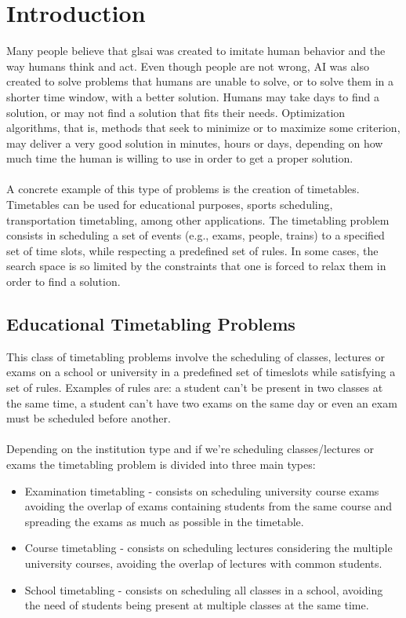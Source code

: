 \setcounter{secnumdepth}{2}
\chapter{Introduction}
\label{introduction}
\thispagestyle{plain}

Many people believe that gls{ai} was created to imitate human behavior and the way humans think and act. Even though people are not wrong, AI was also created to solve problems that humans are unable to solve, or to solve them in a shorter time window, with a better solution. Humans may take days to find a solution, or may not find a solution that fits their needs. Optimization algorithms, that is, methods that seek to minimize or to maximize some criterion, may deliver a very good solution in minutes, hours or days, depending on how much time the human is willing to use in order to get a proper solution.\\
\\
A concrete example of this type of problems is the creation of timetables. Timetables can be used for educational purposes, sports scheduling, transportation timetabling, among other applications. The timetabling problem consists in scheduling a set of events (e.g., exams, people, trains) to a specified set of time slots, while respecting a predefined set of rules. In some cases, the search space is so limited by the constraints that one is forced to relax them in order to find a solution. 


\section{Educational Timetabling Problems}

This class of timetabling problems involve the scheduling of classes, lectures or exams on a school or university in a predefined set of timeslots while satisfying a set of rules. Examples of rules are: a student can't be present in two classes at the same time, a student can't have two exams on the same day or even an exam must be scheduled before another.\\
\\
Depending on the institution type and if we're scheduling classes/lectures or exams the timetabling problem is divided into three main types:

\begin{itemize}
	\item Examination timetabling - consists on scheduling university course exams avoiding the overlap of exams containing students from the same course and spreading the exams as much as possible in the timetable.
	\item Course timetabling - consists on scheduling lectures considering the multiple university courses, avoiding the overlap of lectures with common students.
	\item School timetabling - consists on scheduling all classes in a school, avoiding the need of students being present at multiple classes at the same time.
\end{itemize}


